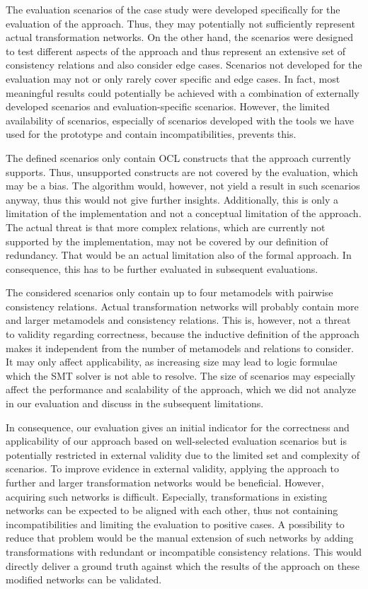 The evaluation scenarios of the case study were developed specifically for the evaluation of the approach.
Thus, they may potentially not sufficiently represent actual transformation networks.
On the other hand, the scenarios were designed to test different aspects of the approach and thus represent an extensive set of consistency relations and also consider edge cases.
Scenarios not developed for the evaluation may not or only rarely cover specific and edge cases.
In fact, most meaningful results could potentially be achieved with a combination of externally developed scenarios and evaluation-specific scenarios.
However, the limited availability of scenarios, especially of scenarios developed with the tools we have used for the prototype and contain incompatibilities, prevents this.

The defined scenarios only contain \gls{OCL} constructs that the approach currently supports.
Thus, unsupported constructs are not covered by the evaluation, which may be a bias.
The algorithm would, however, not yield a result in such scenarios anyway, thus this would not give further insights.
Additionally, this is only a limitation of the implementation and not a conceptual limitation of the approach.
The actual threat is that more complex relations, which are currently not supported by the implementation, may not be covered by our definition of redundancy.
That would be an actual limitation also of the formal approach.
In consequence, this has to be further evaluated in subsequent evaluations.

The considered scenarios only contain up to four metamodels with pairwise consistency relations.
Actual transformation networks will probably contain more and larger metamodels and consistency relations.
This is, however, not a threat to validity regarding correctness, because the inductive definition of the approach makes it independent from the number of metamodels and relations to consider.
It may only affect applicability, as increasing size may lead to logic formulae which the \gls{SMT} solver is not able to resolve.
The size of scenarios may especially affect the performance and scalability of the approach, which we did not analyze in our evaluation and discuss in the subsequent limitations.

In consequence, our evaluation gives an initial indicator for the correctness and applicability of our approach based on well-selected evaluation scenarios but is potentially restricted in external validity due to the limited set and complexity of scenarios.
To improve evidence in external validity, applying the approach to further and larger transformation networks would be beneficial.
However, acquiring such networks is difficult.
Especially, transformations in existing networks can be expected to be aligned with each other, thus not containing incompatibilities and limiting the evaluation to positive cases.
A possibility to reduce that problem would be the manual extension of such networks by adding transformations with redundant or incompatible consistency relations.
This would directly deliver a ground truth against which the results of the approach on these modified networks can be validated.

